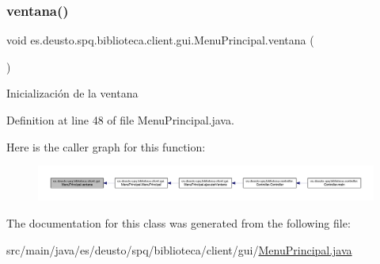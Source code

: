 \subsubsection{\texorpdfstring{ventana()}{ventana()}}
{\footnotesize\ttfamily void es.\+deusto.\+spq.\+biblioteca.\+client.\+gui.\+Menu\+Principal.\+ventana (\begin{DoxyParamCaption}{ }\end{DoxyParamCaption})}

Inicialización de la ventana 

Definition at line 48 of file Menu\+Principal.\+java.

Here is the caller graph for this function\+:
\nopagebreak
\begin{figure}[H]
\begin{center}
\leavevmode
\includegraphics[width=350pt]{classes_1_1deusto_1_1spq_1_1biblioteca_1_1client_1_1gui_1_1_menu_principal_a6d0a1420be215523ce7195628b2c3002_icgraph}
\end{center}
\end{figure}


The documentation for this class was generated from the following file\+:\begin{DoxyCompactItemize}
\item 
src/main/java/es/deusto/spq/biblioteca/client/gui/\mbox{\hyperlink{_menu_principal_8java}{Menu\+Principal.\+java}}\end{DoxyCompactItemize}
